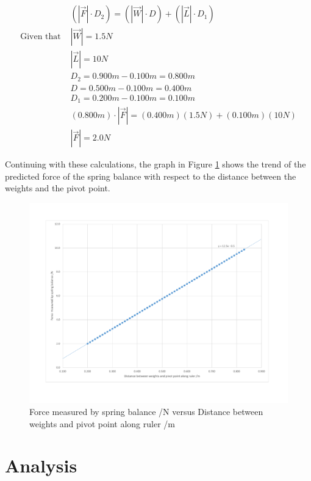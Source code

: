 \documentclass[letterpaper, 12pt]{article}
\begin{document}
\begin{align*}
    \\
                       & \left(\left|\vec{F}\right|\cdot D_2\right) = \left(\left|\vec{W}\right|\cdot D\right) + \left(\left|\vec{L}\right|\cdot D_1\right)
    \\
    \text{Given that } & \left|\vec{W}\right| = 1.5\unit{N}
    \\
                       & \left|\vec{L}\right| = 10\unit{N}
    \\
                       & D_2 = 0.900\unit{m} - 0.100\unit{m} = 0.800\unit{m}
    \\
                       & D = 0.500\unit{m} - 0.100\unit{m} = 0.400\unit{m}
    \\
                       & D_1 = 0.200\unit{m} - 0.100\unit{m} = 0.100\unit{m}
    \\
                       & (0.800\unit{m})\cdot \left|\vec{F}\right| = (0.400\unit{m})(1.5\unit{N}) + (0.100\unit{m})(10\unit{N})
    \\
                       & \left|\vec{F}\right| = 2.0\unit{N}
\end{align*}

Continuing with these calculations, the graph in Figure \ref*{fig:predGraph} shows the
trend of the predicted force of the spring balance with respect to the distance
between the weights and the pivot point.

\begin{figure}[H]
    \centering
    \includegraphics[width=\textwidth]{predictedGraph.pdf}
    \caption{Force measured by spring balance /\unit{N} versus Distance between weights and pivot point along ruler /\unit{m}}
    \label{fig:predGraph}
\end{figure}


\section{Analysis}
\end{document}
